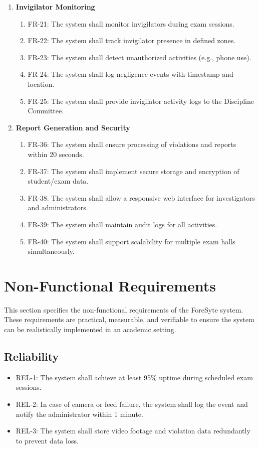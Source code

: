 \begin{enumerate}
    \item \textbf{Invigilator Monitoring}
    \begin{enumerate}[label=(\alph*)]
        \item FR-21: The system shall monitor invigilators during exam sessions.
        \item FR-22: The system shall track invigilator presence in defined zones.
        \item FR-23: The system shall detect unauthorized activities (e.g., phone use).
        \item FR-24: The system shall log negligence events with timestamp and location.
        \item FR-25: The system shall provide invigilator activity logs to the Discipline Committee.
    \end{enumerate}

    \item \textbf{Report Generation and Security}
    \begin{enumerate}[label=(\alph*)]
        \item FR-36: The system shall ensure processing of violations and reports within 20 seconds.
        \item FR-37: The system shall implement secure storage and encryption of student/exam data.
        \item FR-38: The system shall allow a responsive web interface for investigators and administrators.
        \item FR-39: The system shall maintain audit logs for all activities.
        \item FR-40: The system shall support scalability for multiple exam halls simultaneously.
    \end{enumerate}
\end{enumerate}


\section{Non-Functional Requirements}
This section specifies the non-functional requirements of the ForeSyte system. These requirements are practical, measurable, and verifiable to ensure the system can be realistically implemented in an academic setting. 

\subsection{Reliability}
\begin{itemize}
    \item REL-1: The system shall achieve at least 95\% uptime during scheduled exam sessions.  
    \item REL-2: In case of camera or feed failure, the system shall log the event and notify the administrator within 1 minute.  
    \item REL-3: The system shall store video footage and violation data redundantly to prevent data loss.  
\end{itemize}

